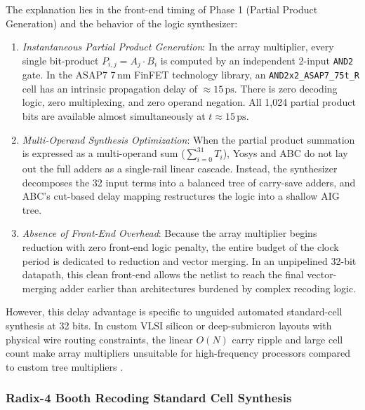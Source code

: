 The explanation lies in the front-end timing of Phase 1 (Partial Product Generation) and the behavior of the logic synthesizer:
\begin{enumerate}
    \item \textit{Instantaneous Partial Product Generation}: In the array multiplier, every single bit-product $P_{i,j} = A_j \cdot B_i$ is computed by an independent 2-input \texttt{AND2} gate. In the ASAP7 7\,nm FinFET technology library, an \texttt{AND2x2\_ASAP7\_75t\_R} cell has an intrinsic propagation delay of  \textbf{$\approx 15\,\text{ps}$}. There is zero decoding logic, zero multiplexing, and zero operand negation. All 1,024 partial product bits are available almost simultaneously at $t \approx 15\,\text{ps}$.
    
    \item \textit{Multi-Operand Synthesis Optimization}: When the partial product summation is expressed as a multi-operand sum ($\sum_{i=0}^{31} T_i$), Yosys and ABC do not lay out the full adders as a single-rail linear cascade. Instead, the synthesizer decomposes the 32 input terms into a balanced tree of carry-save adders, and ABC's cut-based delay mapping restructures the logic into a shallow AIG tree.
    
    \item \textit{Absence of Front-End Overhead}: Because the array multiplier begins reduction with zero front-end logic penalty, the entire budget of the clock period is dedicated to reduction and vector merging. In an unpipelined 32-bit datapath, this clean front-end allows the netlist to reach the final vector-merging adder earlier than architectures burdened by complex recoding logic.
\end{enumerate}

However, this delay advantage is specific to unguided automated standard-cell synthesis at 32 bits. In custom VLSI silicon or deep-submicron layouts with physical wire routing constraints, the linear $O(N)$ carry ripple and large cell count make array multipliers unsuitable for high-frequency processors compared to custom tree multipliers \cite{santoro1989}.

\subsubsection{Radix-4 Booth Recoding Standard Cell Synthesis}

